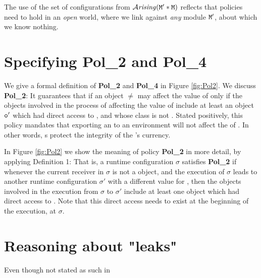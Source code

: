 \documentclass[preprint,10pt]{sigplanconf}
\begin{document}
The use of the set of configurations from ${\mathcal{A}}\textrm{\textit{rising}}({\mbox{\tt{M}}}'*{\mbox{\tt{M}}})$ reflects that policies
 need to hold in an {\em open} world, where
we link against {\em any} module ${\mbox{\tt{M}}}'$, 
about which we know nothing. 
% 
 
 \section{Specifying  {\bf {Pol\_2}} and  {\bf {Pol\_4}}}

We    give a formal definition of {\bf {Pol\_2}} and  {\bf {Pol\_4}}   in Figure \ref{fig:Pol2}. 
We discuss  {\bf {Pol\_2}}: It guarantees
that if an object $\neq$ may affect the value of  only if the  objects 
involved in the process of affecting the value of   include at least an object ${\mbox{\tt{o}}}'$ 
which had direct access to , and 
whose class is  not  . Stated positively, this policy mandates 
that exporting an  to an environment will not affect the  of .  
In other words,
s protect the integrity of the 's currency.
 
In Figure \ref{fig:Pol2} we show the  meaning of policy {\bf {Pol\_2}} in more detail, by applying  Definition 1:
That is, a runtime configuration $\sigma$ satisfies  {\bf {Pol\_2}}  if whenever the current receiver in $\sigma$
is not a  object, and the execution of $\sigma$ leads to another runtime configuration $\sigma'$ 
with a different value for , then the objects involved in the execution from
$\sigma$ to $\sigma'$ include at least one object which had direct access to . 
Note that this direct access needs to exist at the beginning of   the execution, \ie at $\sigma$.

\section{Reasoning about "leaks"}

Even though not stated as such in 

 
 
 
\end{document}

